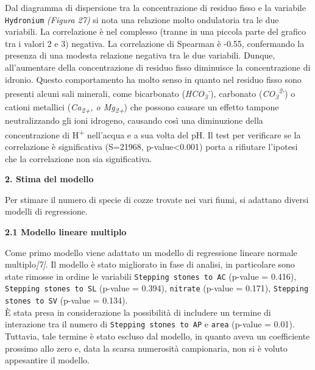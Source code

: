 \documentclass{article} %
\begin{document}
Dal diagramma di dispersione tra la concentrazione di residuo fisso e la variabile \texttt{Hydronium} \textit{(Figura 27)} si nota una relazione molto ondulatoria tra le due variabili.
La correlazione è nel complesso (tranne in una piccola parte del grafico tra i valori 2 e 3) negativa.
La correlazione di Spearman è -0.55, confermando la presenza di una modesta relazione negativa tra le due variabili. Dunque, all'aumentare della concentrazione di residuo fisso diminuisce la concentrazione di idronio.
Questo comportamento ha molto senso in quanto nel residuo fisso sono presenti alcuni sali minerali, come bicarbonato (\textit{HCO\textsubscript{3}\textsuperscript{-}}), carbonato (\textit{CO\textsubscript{3}\textsuperscript{2-}}) o cationi metallici (\textit{Ca\textsubscript{2+}, o Mg\textsubscript{2+}}) che possono causare un effetto tampone neutralizzando gli ioni idrogeno, causando così una diminuzione della concentrazione di H\textsuperscript{+} nell'acqua e a sua volta del pH.
Il test per verificare se la correlazione è significativa (S=21968, p-value<0.001) porta a rifiutare l'ipotesi che la correlazione non sia significativa.

\newpage
\begin{flushleft}
    \textbf{\Huge 2. \: Stima del modello}
    \vskip 10pt
\end{flushleft}

Per stimare il numero di specie di cozze trovate nei vari fiumi, si adattano diversi modelli di regressione.

\vskip 20pt
\begin{flushleft}
    \textbf{\Large 2.1 \: Modello lineare multiplo}
\end{flushleft}
\vskip 10pt

Come primo modello viene adattato un modello di regressione lineare normale multiplo\textit{[7]}. Il modello è stato migliorato in fase di analisi, in particolare sono state rimosse in ordine le variabili \texttt{Stepping stones to AC} (p-value = 0.416), \texttt{Stepping stones to SL} (p-value = 0.394), \texttt{nitrate} (p-value = 0.171),   \texttt{Stepping stones to SV} (p-value = 0.134). \\
È stata presa in considerazione la possibilità di includere un termine di interazione tra il numero di \texttt{Stepping stones to AP} e \texttt{area} (p-value = 0.01). Tuttavia, tale termine è stato escluso dal modello, in quanto aveva un coefficiente prossimo allo zero e, data la scarsa numerosità campionaria, non si è voluto appesantire il modello.
\end{document}
